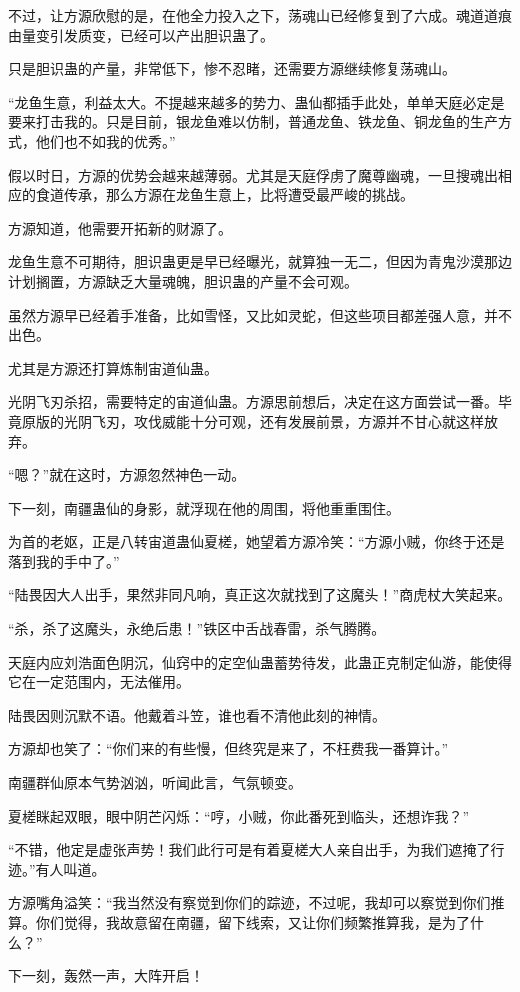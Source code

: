 \begin{this_body}
不过，让方源欣慰的是，在他全力投入之下，荡魂山已经修复到了六成。魂道道痕由量变引发质变，已经可以产出胆识蛊了。

只是胆识蛊的产量，非常低下，惨不忍睹，还需要方源继续修复荡魂山。

“龙鱼生意，利益太大。不提越来越多的势力、蛊仙都插手此处，单单天庭必定是要来打击我的。只是目前，银龙鱼难以仿制，普通龙鱼、铁龙鱼、铜龙鱼的生产方式，他们也不如我的优秀。”

假以时日，方源的优势会越来越薄弱。尤其是天庭俘虏了魔尊幽魂，一旦搜魂出相应的食道传承，那么方源在龙鱼生意上，比将遭受最严峻的挑战。

方源知道，他需要开拓新的财源了。

龙鱼生意不可期待，胆识蛊更是早已经曝光，就算独一无二，但因为青鬼沙漠那边计划搁置，方源缺乏大量魂魄，胆识蛊的产量不会可观。

虽然方源早已经着手准备，比如雪怪，又比如灵蛇，但这些项目都差强人意，并不出色。

尤其是方源还打算炼制宙道仙蛊。

光阴飞刃杀招，需要特定的宙道仙蛊。方源思前想后，决定在这方面尝试一番。毕竟原版的光阴飞刃，攻伐威能十分可观，还有发展前景，方源并不甘心就这样放弃。

“嗯？”就在这时，方源忽然神色一动。

下一刻，南疆蛊仙的身影，就浮现在他的周围，将他重重围住。

为首的老妪，正是八转宙道蛊仙夏槎，她望着方源冷笑：“方源小贼，你终于还是落到我的手中了。”

“陆畏因大人出手，果然非同凡响，真正这次就找到了这魔头！”商虎杖大笑起来。

“杀，杀了这魔头，永绝后患！”铁区中舌战春雷，杀气腾腾。

天庭内应刘浩面色阴沉，仙窍中的定空仙蛊蓄势待发，此蛊正克制定仙游，能使得它在一定范围内，无法催用。

陆畏因则沉默不语。他戴着斗笠，谁也看不清他此刻的神情。

方源却也笑了：“你们来的有些慢，但终究是来了，不枉费我一番算计。”

南疆群仙原本气势汹汹，听闻此言，气氛顿变。

夏槎眯起双眼，眼中阴芒闪烁：“哼，小贼，你此番死到临头，还想诈我？”

“不错，他定是虚张声势！我们此行可是有着夏槎大人亲自出手，为我们遮掩了行迹。”有人叫道。

方源嘴角溢笑：“我当然没有察觉到你们的踪迹，不过呢，我却可以察觉到你们推算。你们觉得，我故意留在南疆，留下线索，又让你们频繁推算我，是为了什么？”

下一刻，轰然一声，大阵开启！

\end{this_body}

